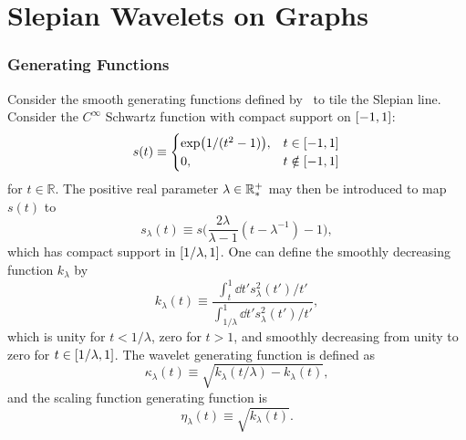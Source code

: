 \section{Slepian Wavelets on Graphs}

\subsubsection{Generating Functions}

Consider the smooth generating functions defined by~\cite{Wiaux2008} to tile the Slepian line.
Consider the \(C^{\infty}\) Schwartz function with compact support on \(\interval{-1}{1}\):
%
\begin{equation}
	s(t) \equiv
	\begin{cases}
		\exp(1/(t^{2}-1)), & t \in \interval{-1}{1}    \\
		0,                 & t \notin \interval{-1}{1}
	\end{cases}
\end{equation}
%
for \(t \in \mathbb{R}\).
The positive real parameter \(\lambda \in \mathbb{R}_{\ast}^{+}{}\) may then be introduced to map \(s(t)\) to
%
\begin{equation}
	s_{\lambda}(t)
	\equiv s\bigg(\frac{2\lambda}{\lambda-1}(t-\lambda^{-1}) - 1\bigg),
\end{equation}
%
which has compact support in \(\interval{1/\lambda}{1}\).
One can define the smoothly decreasing function \(k_{\lambda}\) by
%
\begin{equation}
	k_{\lambda}(t)
	\equiv \frac{\int_{t}^{1} \dd{t'} s^{2}_{\lambda}(t')/t'}
	{\int_{1/\lambda}^{1} \dd{t'} s^{2}_{\lambda}(t')/t'},
\end{equation}
%
which is unity for \(t < 1/\lambda{}\), zero for \(t > 1\), and smoothly decreasing from unity to zero for \(t \in \interval{1/\lambda}{1}\).
The wavelet generating function is defined as
%
\begin{equation}
	\kappa_{\lambda}(t)
	\equiv \sqrt{k_{\lambda}(t/\lambda) - k_{\lambda}(t)},
\end{equation}
%
and the scaling function generating function is
%
\begin{equation}
	\eta_{\lambda}(t)
	\equiv \sqrt{k_{\lambda}(t)}.
\end{equation}

